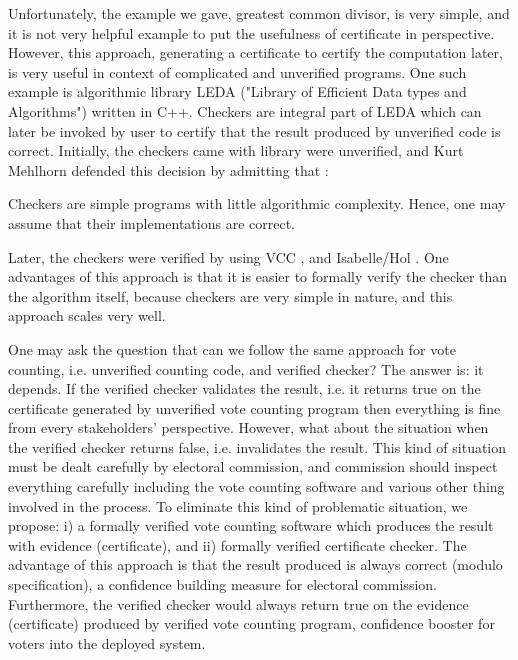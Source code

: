    
   Unfortunately, the example we gave,  greatest common divisor, is very simple, and 
   it is not 
   very helpful example to put the usefulness of certificate in perspective.
   However, this approach, generating a certificate to certify the computation later, is very useful in context 
   of complicated and unverified  programs.   One such example is algorithmic library  
   LEDA \citep{Mehlhorn:1995:LPC:204865.204889} ("Library of Efficient Data types and Algorithms") 
   written in C++.  Checkers are integral part of LEDA 
   which can later be invoked by user to certify that the result produced by unverified 
   code is correct. 
   Initially, the checkers came with library were unverified, and 
   Kurt Mehlhorn defended this decision by admitting that \citep{Alkassar2014}: 
   \begin{displayquote}
   Checkers are simple programs with little algorithmic 
   complexity. Hence, one may assume that their implementations are correct.
	\end{displayquote}   
	\noindent
    Later, the 
   checkers \citep{Alkassar2014} were verified by using VCC \citep{10.1007/978-3-642-03359-9_2}, 
   and Isabelle/Hol \citep{Nipkow:2002:IPA:1791547}.  One advantages of this approach is 
   that it is easier to formally verify the checker than the algorithm itself, because 
   checkers are very simple in nature, and this approach scales very well. 
   
   One may ask the question that can we follow the same approach for vote counting,
   i.e. unverified counting code, and verified checker?  The answer is: it depends. 
   If the verified checker validates the result, i.e. it returns true on  
   the certificate generated by unverified 
   vote counting program then everything is fine from every stakeholders' perspective.
   However, what about the situation when the verified checker returns false, i.e. invalidates 
   the result. This kind of situation must be dealt carefully by electoral commission, and commission should
   inspect everything carefully including the vote counting software and various other thing involved in the
   process.
   To eliminate this kind of problematic situation, we propose: i) a formally verified vote counting
   software which produces the result with evidence (certificate), and ii) formally verified 
   certificate checker. The advantage of this approach is that the result produced is always correct (modulo 
   specification), a confidence building measure for electoral commission. Furthermore, the verified checker would 
   always return true on the evidence (certificate) produced by verified vote counting program, confidence booster for 
   voters into the deployed system.  
  

